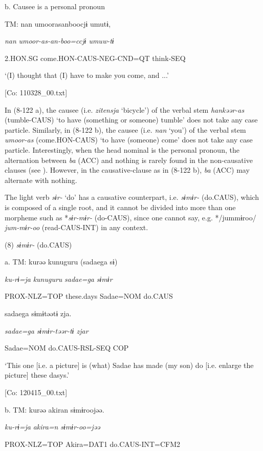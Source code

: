   b. Causee is a personal pronoun

  TM:  nan  umoorasanboocjɨ  umutɨ,

    \textit{nan}  \textit{umoor-as{}-an-boo=ccjɨ  umuw-tɨ}

    2.HON.SG  come.HON-CAUS-NEG-CND=QT  think-SEQ

    ‘(I) thought that (I) have to make you come, and ...’

    [Co: 110328\_00.txt]

In (8-122 a), the causee (i.e. \textit{zitensja} ‘bicycle’) of the verbal stem \textit{hankəər-as} (tumble-CAUS) ‘to have (something or someone) tumble’ does not take any case particle. Similarly, in (8-122 b), the causee (i.e. \textit{nan} ‘you’) of the verbal stem \textit{umoor-as} (come.HON-CAUS) ‘to have (someone) come’ does not take any case particle. Interestingly, when the head nominal is the personal pronoun, the alternation between \textit{ba} (ACC) and nothing is rarely found in the non-causative clauses (see ). However, in the causative-clause as in (8-122 b), \textit{ba} (ACC) may alternate with nothing.

  The light verb \textit{sɨr-} ‘do’ has a causative counterpart, i.e. \textit{sɨmɨr-} (do.CAUS), which is composed of a single root, and it cannot be divided into more than one morpheme such as *\textit{sɨr-mɨr-} (do-CAUS), since one cannot say, e.g. */jummɨroo/ \textit{jum-mɨr-oo} (read-CAUS-INT) in any context.

(8)  \textit{sɨmɨr-} (do.CAUS)

  a.  TM:  kurəə  kunuguru  (sadaega  sɨ)

      \textit{ku-rɨ=ja}  \textit{kunuguru}  \textit{sadae=ga}  \textit{sɨmɨr}

      PROX-NLZ=TOP  these.days  Sadae=NOM  do.CAUS

      sadaega  sɨmɨtəətɨ  zja.

      \textit{sadae=ga}  \textit{sɨmɨr{}-təər-tɨ  zjar}

      Sadae=NOM  do.CAUS-RSL-SEQ  COP

      ‘This one [i.e. a picture] is (what) Sadae has made (my son) do [i.e. enlarge the picture] these dasys.’

      [Co: 120415\_00.txt]

  b.  TM:  kurəə  akiran  sɨmɨroojəə.

      \textit{ku-rɨ=ja}  \textit{akira=n}  \textit{sɨmɨr{}-oo=jəə}

      PROX-NLZ=TOP  Akira=DAT1  do.CAUS-INT=CFM2

